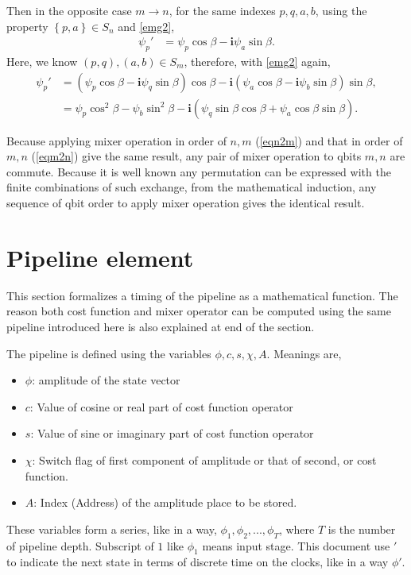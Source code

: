 \documentclass[a4paper]{article}
\newcommand{\eqlabel}[1]{\label{#1}}
\newcommand{\br}[1]{\left(#1\right)}
\newcommand{\cbr}[1]{\left\{#1\right\}}
\newcommand{\ci}{\mathbf{i}}
\begin{document}
Then in the opposite case \(m\to n\), for the same indexes \(p, q, a, b\), using the property \(\cbr{p, a}\in S_n\) and \eqref{emg2},
\begin{align}
    \psi_{p}' &= \psi_p\cos\beta - \ci \psi_a \sin \beta.
\end{align}
Here, we know \((p, q), (a, b)\in S_m\), therefore, with \eqref{emg2} again,
\begin{align}
    \nonumber
    \psi_{p}' &= (\psi_p\cos\beta - \ci \psi_q \sin \beta)\cos\beta - \ci (\psi_a\cos\beta - \ci \psi_b \sin \beta) \sin \beta, \\
    \eqlabel{eqm2n}
    &= \psi_p \cos^2\beta - \psi_b\sin^2\beta -\ci\br{\psi_q\sin\beta\cos\beta + \psi_a\cos\beta\sin\beta}.
\end{align}

Because applying mixer operation in order of \(n, m\) (\eqref{eqn2m}) and that in order of \(m, n\) (\eqref{eqm2n}) give the same result, any pair of mixer operation to qbits \(m, n\) are commute. Because it is well known any permutation can be expressed with the finite combinations of such exchange, from the mathematical induction, any sequence of qbit order to apply mixer operation gives the identical result. 

\section{Pipeline element}
\label{spipe}
This section formalizes a timing of the pipeline as a mathematical function. The reason both cost function and mixer operator can be computed using the same pipeline introduced here is also explained at end of the section.

The pipeline is defined using the variables \(\phi, c, s, \chi, A\). Meanings are,
\begin{itemize}
    \item \(\phi\): amplitude of the state vector
    \item \(c\): Value of cosine or real part of cost function operator
    \item \(s\): Value of sine or imaginary part of cost function operator
    \item \(\chi\): Switch flag of first component of amplitude or that of second, or cost function.
    \item \(A\): Index (Address) of the amplitude place to be stored.
\end{itemize}
These variables form a series, like in a way, \(\phi_1, \phi_2, ..., \phi_T\), where  \(T\) is the number of pipeline depth. Subscript of \(1\) like \(\phi_1\) means input stage. This document use \('\) to indicate the next state in terms of discrete time on the clocks, like in a way \(\phi'\). 
\end{document}
